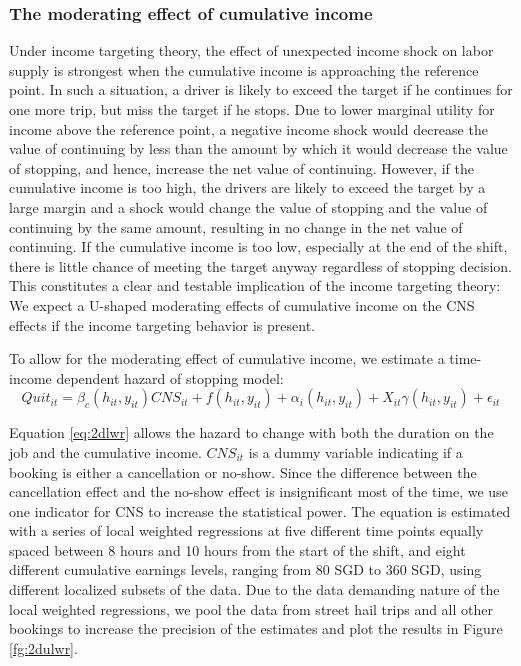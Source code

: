\documentclass[reviewmode,AEJ]{AEA}
\begin{document}
\subsubsection{The moderating effect of cumulative income} Under income targeting theory, the effect of unexpected income shock on labor supply is strongest when the cumulative income is approaching the reference point. In such a situation, a driver is likely to exceed the target if he continues for one more trip, but  miss the target if he stops. Due to lower marginal utility for income above the reference point, a negative income shock would decrease the value of continuing by less than the amount by which it would decrease the value of stopping, and hence, increase the net value of continuing. However, if %
the cumulative income is too high, the drivers are likely to exceed the target by a large margin and a shock would change the value of stopping and the value of continuing by the same amount, resulting in no change in the net value of continuing. If the cumulative income is too low, especially at the end of the shift, there is little chance of meeting the target anyway regardless of stopping decision. This constitutes a clear and testable implication of the income targeting theory: We expect a U-shaped moderating effects of cumulative income on the CNS effects if the income targeting behavior is present.

To allow for the moderating effect of cumulative income, we estimate a time-income dependent hazard of stopping model:
\begin{equation}
    \label{eq:2dlwr}
    Quit_{it} = \beta_c(h_{it}, y_{it}) {CNS}_{it} + f(h_{it}, y_{it}) + \alpha_{i}(h_{it}, y_{it}) + X_{it}\gamma(h_{it}, y_{it}) + \epsilon_{it}
\end{equation}

Equation \eqref{eq:2dlwr} allows the hazard to change with both the duration on the job and the cumulative income. $CNS_{it}$ is a dummy variable indicating if a booking is either a cancellation or no-show.  Since the difference between the cancellation effect and the no-show effect is insignificant most of the time, we 
use one indicator for CNS to increase the statistical power. The equation is estimated with a series of local weighted regressions at five different time points equally spaced between 8 hours and 10 hours from the start of the shift, and eight different cumulative earnings levels, ranging from 80 SGD to 360 SGD, using different localized subsets of the data.  
Due to the data demanding nature of the local weighted regressions, we  pool the data from street hail trips and all other bookings to increase the precision of the estimates and plot the results in Figure \ref{fg:2dulwr}.
\end{document}
